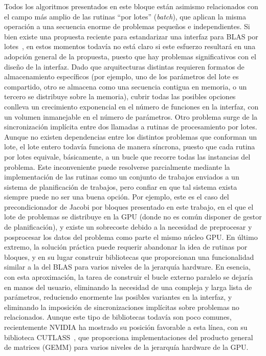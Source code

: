 Todos los algoritmos presentados en este bloque están asimismo relacionados con
el campo más amplio de las rutinas ``por lotes'' (\textit{batch}), que aplican
la misma operación a una secuencia enorme de problemas pequeños e
independientes. Si bien existe una propuesta reciente para estandarizar una
interfaz para BLAS por lotes~\cite{batched-blas}, en estos momentos todavía no
está claro si este esfuerzo resultará en una adopción general de la propuesta,
puesto que hay problemas significativos con el diseño de la interfaz.  Dado que
arquitecturas distintas requieren formatos de almacenamiento específicos (por
ejemplo, uno de los parámetros del lote es compartido, otro se almacena como una
secuencia contigua en memoria, o un tercero se distribuye sobre la memoria),
cubrir todas las posibles opciones conlleva un crecimiento exponencial en el
número de funciones en la interfaz, con un volumen inmanejable en el número de
parámetros.  Otro problema surge de la sincronización implícita entre dos
llamadas a rutinas de procesamiento por lotes. Aunque no existen dependencias
entre los distintos problemas que conforman un lote, el lote entero todavía
funciona de manera síncrona, puesto que cada rutina por lotes equivale,
básicamente, a un bucle que recorre todas las instancias del problema.  Este
inconveniente puede resolverse parcialmente mediante la implementación de las
rutinas como un conjunto de trabajos enviados a un sistema de planificación de
trabajos, pero confiar en que tal sistema exista siempre puede no ser una buena
opción.  Por ejemplo, este es el caso del precondicionador de Jacobi por bloques
presentado en este trabajo, en el que el lote de problemas se distribuye en la
GPU (donde no es común disponer de gestor de planificación), y existe un
sobrecoste debido a la necesidad de preprocesar y posprocesar los datos del
problema como parte el mismo núcleo GPU. En último extremo, la solución práctica
puede requerir abandonar la idea de rutinas por bloques, y en su lugar construir
bibliotecas que proporcionan una funcionalidad similar a la del BLAS para varios
niveles de la jerarquía hardware. En esencia, con esta aproximación, la tarea de
construir el bucle externo paralelo se dejaría en manos del usuario, eliminando
la necesidad de una compleja y larga lista de parámetros, reduciendo enormente
las posibles variantes en la interfaz, y eliminando la imposición de
sincronizaciones implícitas sobre problemas no relacionados.  Aunque este tipo
de bibliotecas todavía son poco comunes, recientemente NVIDIA ha mostrado su
posición favorable a esta línea, con su biblioteca CUTLASS~\cite{cutlass}, que
proporciona implementaciones del producto general de matrices (GEMM) para varios
niveles de la jerarquía hardware de la GPU. 

